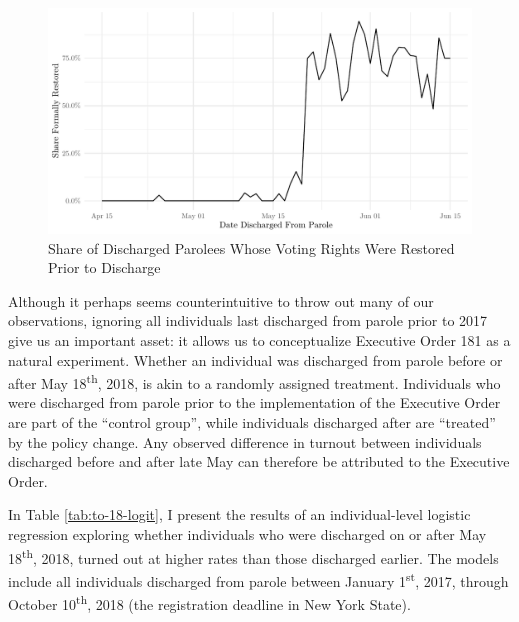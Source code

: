 \documentclass[]{article}
\begin{document}
\begin{figure}[H]

{\centering \includegraphics{felony_disenfranchisement_nys_files/figure-latex/restoration-chart-chunk-1} 

}

\caption{\label{fig:restoration-chart}Share of Discharged Parolees Whose Voting Rights Were Restored Prior to Discharge}\label{fig:restoration-chart-chunk}
\end{figure}

Although it perhaps seems counterintuitive to throw out many of our observations, ignoring all individuals last discharged from parole prior to 2017 give us an important asset: it allows us to conceptualize Executive Order 181 as a natural experiment. Whether an individual was discharged from parole before or after May 18\textsuperscript{th}, 2018, is akin to a randomly assigned treatment. Individuals who were discharged from parole prior to the implementation of the Executive Order are part of the ``control group'', while individuals discharged after are ``treated'' by the policy change. Any observed difference in turnout between individuals discharged before and after late May can therefore be attributed to the Executive Order.

In Table \ref{tab:to-18-logit}, I present the results of an individual-level logistic regression exploring whether individuals who were discharged on or after May 18\textsuperscript{th}, 2018, turned out at higher rates than those discharged earlier. The models include all individuals discharged from parole between January 1\textsuperscript{st}, 2017, through October 10\textsuperscript{th}, 2018 (the registration deadline in New York State).


\end{document}
